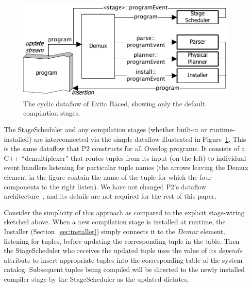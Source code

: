 \begin{figure}[htbp]
\begin{center}
\includegraphics{figures/DefaultCompiler}
\ssp
\caption{The cyclic dataflow of Evita Raced, showing only the default compilation stages.}
\label{fig:basecompiler}
\end{center}
\end{figure}

The StageScheduler and any compilation stages (whether built-in or
runtime-installed) are interconnected via the simple dataflow
illustrated in Figure~\ref{fig:basecompiler}. This is the same dataflow
that P2 constructs for all Overlog programs. It consists of a C++ ``demultiplexer'' that
routes tuples from its input (on the left) to individual event handlers listening for
particular tuple names (the arrows leaving the Demux element in the
figure contain the name of the tuple for which the four components to the
right listen).  We have not changed P2's dataflow architecture~\cite{p2:sosp}, and its
details are not required for the rest of this paper.  

Consider the simplicity of this approach as compared to the explicit
stage-wiring  sketched above. When a new compilation stage is installed
at runtime, the Installer (Section~\ref{sec:installer})
simply connects it to the {\em Demux} element, listening for
 tuples, before updating the corresponding
tuple in the  table. 
Then the StageScheduler who receives the updated  tuple uses
the value of its $depends$ attribute  to insert appropriate 
 tuples into the corresponding table of the
system catalog. Subsequent  tuples being compiled will be directed to
the newly installed compiler stage by the StageScheduler as the updated
 dictates.

